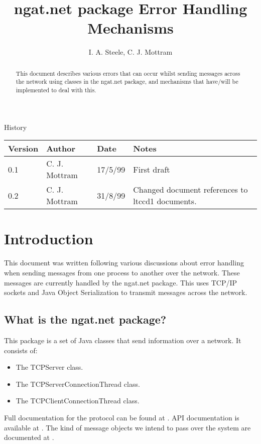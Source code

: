 \documentclass[10pt,a4paper]{article}
\title{ngat.net package Error Handling Mechanisms}
\author{I. A. Steele, C. J. Mottram}
\date{}
\begin{document}
\thispagestyle{empty}
\maketitle
\begin{abstract}
This document describes various errors that can occur whilst sending messages across the network using
 classes in the ngat.net package, and mechanisms that have/will be implemented to deal with this.
\end{abstract}

\centerline{\Large History}
\begin{center}
\begin{tabular}{|l|l|l|p{15em}|}
\hline
{\bf Version} & {\bf Author} & {\bf Date} & {\bf Notes} \\
\hline
0.1 &              C. J. Mottram & 17/5/99 & First draft \\
0.2 &              C. J. Mottram & 31/8/99 & Changed document references to ltccd1 documents. \\
\hline
\end{tabular}
\end{center}

\newpage
\tableofcontents
\listoftables
\newpage

\section{Introduction}
This document was written following various discussions about error handling when sending
messages from one process to another over the network. These messages are currently handled
by the ngat.net package. This uses TCP/IP sockets and Java Object Serialization to transmit
messages across the network. 
\subsection{What is the ngat.net package?}
This package is a set of Java classes that send information over a network.
It consists of:
\begin{itemize}
\item The TCPServer class.
\item The TCPServerConnectionThread class.
\item The TCPClientConnectionThread class.
\end{itemize}
Full documentation for the protocol can be found at \cite{bib:ngatnetlatex}. API documentation is available at
\cite{bib:ngatnettree}. The kind of message objects we intend to pass over the system are documented at
\cite{bib:jmsdd}.
\end{document}
